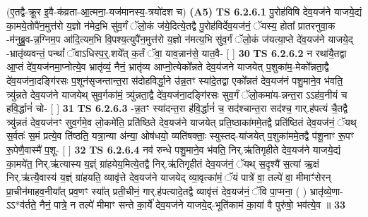 \documentclass[17pt]{extarticle}
\begin{document}
                      (ए॒तद्वै-क्रू॒र इ॒वै-क॑व्रता-आ॒त्मना॒-यज॑मानस्य॒-त्रयो॑दश च)  \textbf{(A5)} \newline \newline
                                        \textbf{ TS 6.2.6.1} \newline
                  पु॒रोह॑विषि देव॒यज॑ने याजये॒द्यं का॒मये॒तोपै॑न॒मुत्त॑रो य॒ज्ञो न॑मेद॒भि सु॑व॒र्गं ॅलो॒कं ज॑ये॒दित्ये॒तद्वै पु॒रोह॑विर्देव॒यज॑नं॒ ॅयस्य॒ होता᳚ प्रातरनुवा॒क -म॑नुब्रु॒व-न्न॒ग्निम॒प आ॑दि॒त्यम॒भि वि॒पश्य॒त्युपै॑न॒मुत्त॑रो य॒ज्ञो न॑मत्य॒भि सु॑व॒र्गं ॅलो॒कं ज॑यत्या॒प्ते दे॑व॒यज॑ने याजये॒द् -भ्रातृ॑व्यवन्तं॒ पन्थां᳚ ॅवाऽधिस्प॒र्॒.शये᳚त् क॒र्तं ॅवा॒ याव॒न्नान॑से॒ यात॒वै- [  ] \textbf{  30} \newline
                  \newline
                                \textbf{ TS 6.2.6.2} \newline
                  न रथा॑यै॒तद्वा आ॒प्तं दे॑व॒यज॑नमा॒प्नोत्ये॒व भ्रातृ॑व्यं॒ नैनं॒ भ्रातृ॑व्य आप्नो॒त्येको᳚न्नते देव॒य॑जने याजयेत् प॒शुका॑म॒-मेको᳚न्नता॒द्वै दे॑व॒यज॑ना॒दङ्गि॑रसः प॒शून॑सृजन्तान्त॒रा स॑दोहविर्द्धा॒ने उ॑न्न॒तꣳ स्या॑दे॒तद्वा एको᳚न्नतं देव॒यज॑नं पशु॒माने॒व भ॑वति॒ त्र्यु॑न्नते देव॒यज॑ने याजयेथ् सुव॒र्गका॑मं॒ त्र्यु॑न्नता॒द्वै दे॑व॒यज॑ना॒दङ्गि॑रसः सुव॒र्गं ॅलो॒कमा॑य-न्नन्त॒रा ऽऽह॑व॒नीयं च हवि॒र्द्धानं॑ चो- [  ] \textbf{  31} \newline
                  \newline
                                \textbf{ TS 6.2.6.3} \newline
                  -न्न॒तꣳ स्या॑दन्त॒रा ह॑वि॒र्द्धानं॑ च॒ सद॑श्चान्त॒रा सद॑श्च॒ गार्.ह॑पत्यं चै॒तद्वै त्र्यु॑न्नतं देव॒यज॑नꣳ सुव॒र्गमे॒व लो॒कमे॑ति॒ प्रति॑ष्ठिते देव॒यज॑ने याजयेत् प्रति॒ष्ठाका॑ममे॒तद्वै प्रति॑ष्ठितं देव॒यज॑नं॒ ॅयथ् स॒र्वतः॑ स॒मं प्रत्ये॒व ति॑ष्ठति॒ यत्रा॒न्या अ॑न्या॒ ओष॑धयो॒ व्यति॑षक्ताः॒ स्युस्तद्-या॑जयेत् प॒शुका॑ममे॒तद्वै प॑शू॒नाꣳ रू॒पꣳ रू॒पेणै॒वास्मै॑ प॒शू- [  ] \textbf{  32} \newline
                  \newline
                                \textbf{ TS 6.2.6.4} \newline
                  नव॑ रुन्धे पशु॒माने॒व भ॑वति॒ निर्.ऋ॑तिगृहीते देव॒यज॑ने याजये॒द्यं का॒मये॑त॒ निर्.ऋ॑त्यास्य य॒ज्ञ्ं ग्रा॑हयेय॒मित्ये॒तद्वै निर्.ऋ॑तिगृहीतं देव॒यज॑नं॒ ॅयथ् स॒दृश्यै॑ स॒त्या॑ ऋ॒क्षं निर्.ऋ॑त्यै॒वास्य॑ य॒ज्ञ्ं ग्रा॑हयति॒ व्यावृ॑त्ते देव॒यज॑ने याजयेद् व्या॒वृत्का॑मं॒ ॅयं पात्रे॑ वा॒ तल्पे॑ वा॒ मीमाꣳ॑सेरन् प्रा॒चीन॑माहव॒नीया᳚त् प्रव॒णꣳ स्या᳚त् प्रती॒चीनं॒ गार्.ह॑पत्यादे॒तद्वै व्यावृ॑त्तं देव॒यज॑नं॒ ॅवि पा॒प्मना॒ ( ) भ्रातृ॑व्ये॒णा- ऽऽ*व॑र्तते॒ नैनं॒ पात्रे॒ न तल्पे॑ मीमाꣳ सन्ते का॒र्ये॑ देव॒यज॑ने याजये॒द्-भूति॑कामं का॒या॑ वै पुरु॑षो॒ भव॑त्ये॒व ॥ \textbf{  33} \newline
\end{document}
